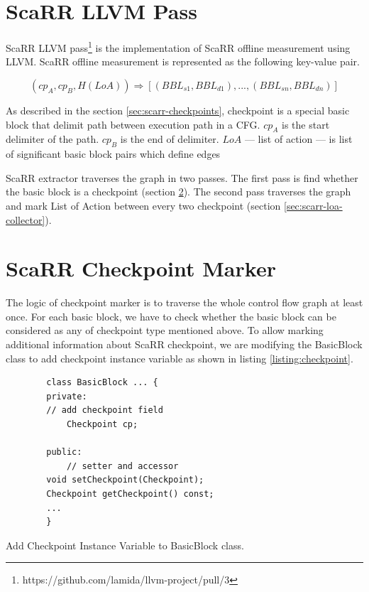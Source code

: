 \section{ScaRR LLVM Pass} 

ScaRR LLVM pass\footnote{https://github.com/lamida/llvm-project/pull/3} is the implementation of ScaRR offline measurement using LLVM. ScaRR offline measurement is represented as the following key-value pair.

$$(cp_A, cp_B, H(LoA)) \Rightarrow [(BBL_{s1}, BBL_{d1}), ..., (BBL_{sn}, BBL_{dn})]$$

As described in the section \ref{sec:scarr-checkpoints}, checkpoint is a special basic block that delimit path between execution path in a CFG. $cp_A$ is the start delimiter of the path. $cp_B$ is the end of delimiter. $LoA$ — list of action — is list of significant basic block pairs which define edges 

ScaRR extractor traverses the graph in two passes. The first pass is find whether the basic block is a checkpoint (section \ref{sec:scarr-checkpoint-marker}). The second pass traverses the graph and mark List of Action between every two checkpoint (section \ref{sec:scarr-loa-collector}). 

\section{ScaRR Checkpoint Marker} \label{sec:scarr-checkpoint-marker}

The logic of checkpoint marker is to traverse the whole control flow graph at least once. For each basic block, we have to check whether the basic block can be considered as any of checkpoint type mentioned above. To allow marking additional information about ScaRR checkpoint, we are modifying the BasicBlock class to add checkpoint instance variable as shown in listing \ref{listing:checkpoint}.

\begin{listing}[htbp]
    \begin{verbatim}
        class BasicBlock ... {
        private:
        // add checkpoint field
            Checkpoint cp;

        public:
            // setter and accessor
        void setCheckpoint(Checkpoint);
        Checkpoint getCheckpoint() const;
        ...
        }
    \end{verbatim}
    \caption{Add Checkpoint Instance Variable to BasicBlock class.}    
    \label{listing:checkpoint}
\end{listing}

